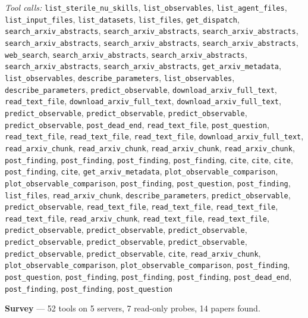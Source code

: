 \documentclass[11pt,a4paper]{article}
\begin{document}
\textit{Tool calls:} \texttt{list\_sterile\_nu\_skills}, \texttt{list\_observables}, \texttt{list\_agent\_files}, \texttt{list\_input\_files}, \texttt{list\_datasets}, \texttt{list\_files}, \texttt{get\_dispatch}, \texttt{search\_arxiv\_abstracts}, \texttt{search\_arxiv\_abstracts}, \texttt{search\_arxiv\_abstracts}, \texttt{search\_arxiv\_abstracts}, \texttt{search\_arxiv\_abstracts}, \texttt{search\_arxiv\_abstracts}, \texttt{web\_search}, \texttt{search\_arxiv\_abstracts}, \texttt{search\_arxiv\_abstracts}, \texttt{search\_arxiv\_abstracts}, \texttt{search\_arxiv\_abstracts}, \texttt{get\_arxiv\_metadata}, \texttt{list\_observables}, \texttt{describe\_parameters}, \texttt{list\_observables}, \texttt{describe\_parameters}, \texttt{predict\_observable}, \texttt{download\_arxiv\_full\_text}, \texttt{read\_text\_file}, \texttt{download\_arxiv\_full\_text}, \texttt{download\_arxiv\_full\_text}, \texttt{predict\_observable}, \texttt{predict\_observable}, \texttt{predict\_observable}, \texttt{predict\_observable}, \texttt{post\_dead\_end}, \texttt{read\_text\_file}, \texttt{post\_question}, \texttt{read\_text\_file}, \texttt{read\_text\_file}, \texttt{read\_text\_file}, \texttt{download\_arxiv\_full\_text}, \texttt{read\_arxiv\_chunk}, \texttt{read\_arxiv\_chunk}, \texttt{read\_arxiv\_chunk}, \texttt{read\_arxiv\_chunk}, \texttt{post\_finding}, \texttt{post\_finding}, \texttt{post\_finding}, \texttt{post\_finding}, \texttt{cite}, \texttt{cite}, \texttt{cite}, \texttt{post\_finding}, \texttt{cite}, \texttt{get\_arxiv\_metadata}, \texttt{plot\_observable\_comparison}, \texttt{plot\_observable\_comparison}, \texttt{post\_finding}, \texttt{post\_question}, \texttt{post\_finding}, \texttt{list\_files}, \texttt{read\_arxiv\_chunk}, \texttt{describe\_parameters}, \texttt{predict\_observable}, \texttt{predict\_observable}, \texttt{read\_text\_file}, \texttt{read\_text\_file}, \texttt{read\_text\_file}, \texttt{read\_text\_file}, \texttt{read\_arxiv\_chunk}, \texttt{read\_text\_file}, \texttt{read\_text\_file}, \texttt{predict\_observable}, \texttt{predict\_observable}, \texttt{predict\_observable}, \texttt{predict\_observable}, \texttt{predict\_observable}, \texttt{predict\_observable}, \texttt{predict\_observable}, \texttt{predict\_observable}, \texttt{cite}, \texttt{read\_arxiv\_chunk}, \texttt{plot\_observable\_comparison}, \texttt{plot\_observable\_comparison}, \texttt{post\_finding}, \texttt{post\_question}, \texttt{post\_finding}, \texttt{post\_finding}, \texttt{post\_finding}, \texttt{post\_dead\_end}, \texttt{post\_finding}, \texttt{post\_finding}, \texttt{post\_question}\par
\textbf{Survey} --- 52 tools on 5 servers, 7 read-only probes, 14 papers found.
\end{document}
